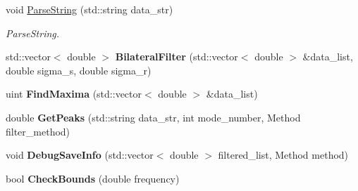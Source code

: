 \begin{DoxyCompactItemize}
void \hyperlink{class_mode_track_a9e59f0ed0b57daebd0d051d594faf1f9}{Parse\-String} (std\-::string data\-\_\-str)
\begin{DoxyCompactList}\small\item\em Parse\-String. \end{DoxyCompactList}\item 
\hypertarget{class_mode_track_abb8bbf4d81e0333da7d176c1e475ceaa}{std\-::vector$<$ double $>$ {\bfseries Bilateral\-Filter} (std\-::vector$<$ double $>$ \&data\-\_\-list, double sigma\-\_\-s, double sigma\-\_\-r)}\label{class_mode_track_abb8bbf4d81e0333da7d176c1e475ceaa}

\item 
\hypertarget{class_mode_track_a0102fdc2d13318b65d2127e4733725c6}{uint {\bfseries Find\-Maxima} (std\-::vector$<$ double $>$ \&data\-\_\-list)}\label{class_mode_track_a0102fdc2d13318b65d2127e4733725c6}

\item 
\hypertarget{class_mode_track_aab5c7a6c9acd8478b93a4e943e67dcb3}{double {\bfseries Get\-Peaks} (std\-::string data\-\_\-str, int mode\-\_\-number, Method filter\-\_\-method)}\label{class_mode_track_aab5c7a6c9acd8478b93a4e943e67dcb3}

\item 
\hypertarget{class_mode_track_aac2fd6070522ecbfa7b2b2295416f72d}{void {\bfseries Debug\-Save\-Info} (std\-::vector$<$ double $>$ filtered\-\_\-list, Method method)}\label{class_mode_track_aac2fd6070522ecbfa7b2b2295416f72d}

\item 
\hypertarget{class_mode_track_ad95e1bb9346109bcda61f25e9cc2cdc6}{bool {\bfseries Check\-Bounds} (double frequency)}\label{class_mode_track_ad95e1bb9346109bcda61f25e9cc2cdc6}

\end{DoxyCompactItemize}

